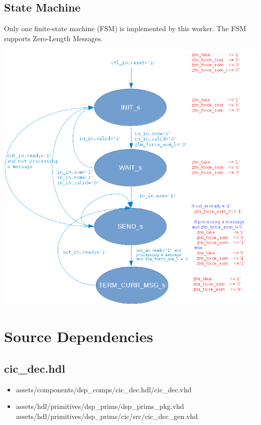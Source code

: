 \documentclass{article}
\def\comp{cic\_dec}
\begin{document}
\subsection*{State Machine}
\begin{flushleft}
	Only one finite-state machine (FSM) is implemented by this worker. The FSM supports Zero-Length Messages.
\end{flushleft}
{\centering\captionsetup{type=figure}\includegraphics[scale=0.45]{cic_decimator_zlm_fsm}
	\label{fig:zlm_fsm}}

\newpage

\section*{Source Dependencies}
\subsection*{\comp.hdl}
\begin{itemize}
	\item assets/components/dsp\_comps/cic\_dec.hdl/cic\_dec.vhd
	\item assets/hdl/primitives/dsp\_prims/dsp\_prims\_pkg.vhd
	      \subitem assets/hdl/primitives/dsp\_prims/cic/src/cic\_dec\_gen.vhd
\end{itemize}
\end{document}
